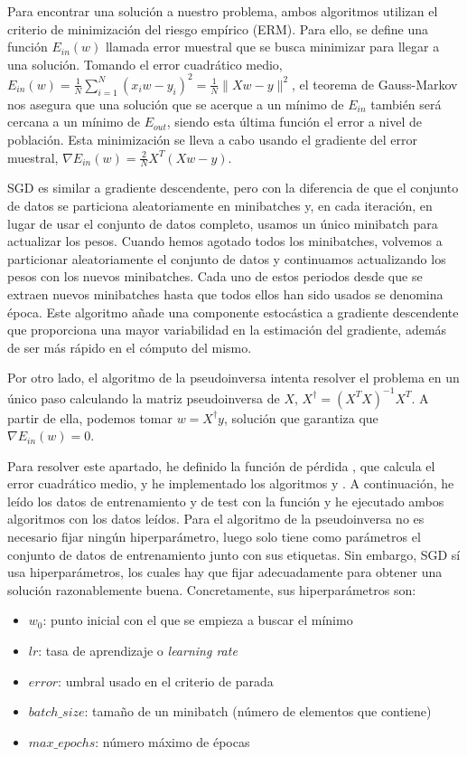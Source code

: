 \documentclass[10pt,a4paper]{article}
\begin{document}
Para encontrar una solución a nuestro problema, ambos algoritmos utilizan el criterio de minimización del riesgo empírico (ERM). Para ello, se define una función $E_{in}(w)$ llamada error muestral que se busca minimizar para llegar a una solución. Tomando el error cuadrático medio, $E_{in}(w) = \frac{1}{N} \sum_{i=1}^N (x_i w - y_i)^2 = \frac{1}{N} \|Xw-y\|^2$, el teorema de Gauss-Markov nos asegura que una solución que se acerque a un mínimo de $E_{in}$ también será cercana a un mínimo de $E_{out}$, siendo esta última función el error a nivel de población. Esta minimización se lleva a cabo usando el gradiente del error muestral, $\nabla E_{in}(w) = \frac{2}{N} X^T (Xw-y)$.

SGD es similar a gradiente descendente, pero con la diferencia de que el conjunto de datos se particiona aleatoriamente en minibatches y, en cada iteración, en lugar de usar el conjunto de datos completo, usamos un único minibatch para actualizar los pesos. Cuando hemos agotado todos los minibatches, volvemos a particionar aleatoriamente el conjunto de datos y continuamos actualizando los pesos con los nuevos minibatches. Cada uno de estos periodos desde que se extraen nuevos minibatches hasta que todos ellos han sido usados se denomina época. Este algoritmo añade una componente estocástica a gradiente descendente que proporciona una mayor variabilidad en la estimación del gradiente, además de ser más rápido en el cómputo del mismo.

Por otro lado, el algoritmo de la pseudoinversa intenta resolver el problema en un único paso calculando la matriz pseudoinversa de $X$, $X^{\dag} = (X^T X)^{-1} X^T$. A partir de ella, podemos tomar $w = X^{\dag} y$, solución que garantiza que $\nabla E_{in}(w) = 0$.

Para resolver este apartado, he definido la función de pérdida , que calcula el error cuadrático medio, y he implementado los algoritmos  y . A continuación, he leído los datos de entrenamiento y de test con la función  y he ejecutado ambos algoritmos con los datos leídos. Para el algoritmo de la pseudoinversa no es necesario fijar ningún hiperparámetro, luego solo tiene como parámetros el conjunto de datos de entrenamiento junto con sus etiquetas. Sin embargo, SGD sí usa hiperparámetros, los cuales hay que fijar adecuadamente para obtener una solución razonablemente buena. Concretamente, sus hiperparámetros son:

\begin{itemize}
	\item $w_0$: punto inicial con el que se empieza a buscar el mínimo
	\item $lr$: tasa de aprendizaje o \textit{learning rate}
	\item $error$: umbral usado en el criterio de parada
	\item $batch\_size$: tamaño de un minibatch (número de elementos que contiene)
	\item $max\_epochs$: número máximo de épocas
\end{itemize}
\end{document}
